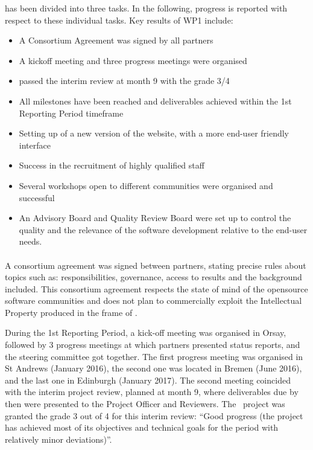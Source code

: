 \documentclass{deliverablereport}
\begin{document}
 has been divided into three tasks. In the following, progress is reported with respect to these individual tasks.
Key results of WP1 include:

\begin{itemize}
\item{A Consortium Agreement was signed by all partners}
\item{A kickoff meeting and three progress meetings were organised}
\item{\ODK passed the interim review at month 9 with the grade 3/4}
\item{All milestones have been reached and deliverables achieved within the 1st Reporting Period timeframe}
\item{Setting up of a new version of the \ODK website, with a more end-user friendly interface}
\item{Success in the recruitment of highly qualified staff}
\item{Several workshops open to different communities were organised and successful}
\item{An Advisory Board and Quality Review Board were set up to control the quality and the relevance of the software development relative to the end-user needs.}
\end{itemize}

\paragraph{}

A consortium agreement was signed
between partners, stating precise rules about topics such as:
responsibilities, governance, access to results and the background
included.  This consortium agreement respects the state of mind of the opensource software communities and does not plan to commercially exploit the Intellectual Property produced in the frame of \ODK.

During the 1st Reporting Period, a kick-off meeting was organised in Orsay, followed by
3 progress meetings at which partners presented status reports, and
the steering committee got together.  The first progress meeting was
organised in St Andrews (January 2016), the second one was located
in Bremen (June 2016), and the last one in Edinburgh (January 2017). The second meeting coincided with the interim project
review, planned at month 9, where deliverables due by then were
presented to the Project Officer and Reviewers. The \ODK\ project was
granted the grade 3 out of 4 for this interim review: ``Good progress
(the project has achieved most of its objectives and technical goals
for the period with relatively minor deviations)''.
\end{document}
